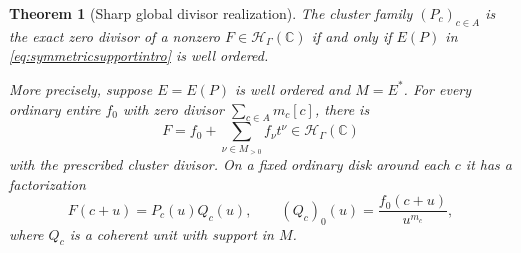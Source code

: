 \documentclass[11pt,letterpaper]{article}
\newtheorem{theorem}{Theorem}[section]
\theoremstyle{definition}
\theoremstyle{remark}
\newcommand{\C}{\mathbb C}
\newcommand{\HH}{\mathscr H_\Gamma}
\numberwithin{equation}{section}
\begin{document}
\begin{theorem}[Sharp global divisor realization]\label{thm:divisor}
The cluster family $(P_c)_{c\in A}$ is the exact zero divisor of a nonzero $F\in\HH(\C)$ if and only if $E(P)$ in \eqref{eq:symmetricsupportintro} is well ordered.

More precisely, suppose $E=E(P)$ is well ordered and $M=E^*$. For every ordinary entire $f_0$ with zero divisor $\sum_{c\in A}m_c[c]$, there is
\begin{equation}\label{eq:realizer}
 F=f_0+\sum_{\nu\in M_{>0}}f_\nu t^\nu\in\HH(\C)
\end{equation}
with the prescribed cluster divisor. On a fixed ordinary disk around each $c$ it has a factorization
\begin{equation}\label{eq:realizerlocal}
 F(c+u)=P_c(u)Q_c(u),\qquad
 (Q_c)_0(u)=\frac{f_0(c+u)}{u^{m_c}},
\end{equation}
where $Q_c$ is a coherent unit with support in $M$.
\end{theorem}
\end{document}
